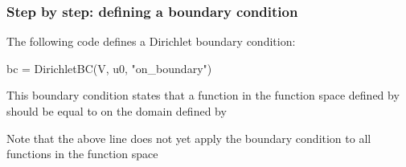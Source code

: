 \begin{frame}[fragile]
  \frametitle{Step by step: defining a boundary condition}

  The following code defines a Dirichlet boundary condition:
\vspace{-1em}
\begin{python}
bc = DirichletBC(V, u0, "on_boundary")
\end{python}

  This boundary condition states that a function in the function space
  defined by  should be equal to  on the domain defined
  by 

  \bigskip

  Note that the above line does not yet apply the boundary condition
  to all functions in the function space

\end{frame}
